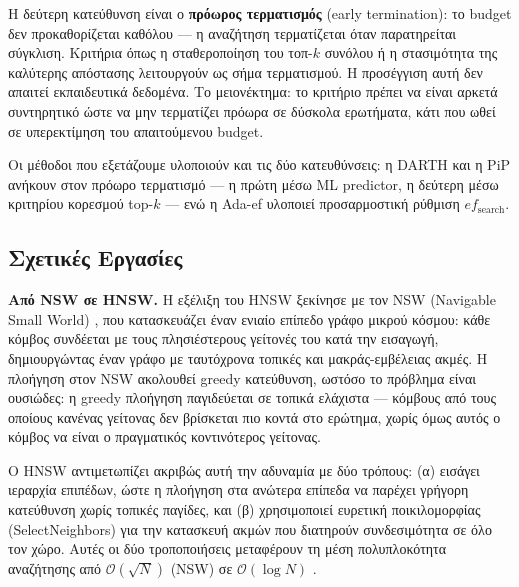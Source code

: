 \documentclass[12pt,a4paper]{article}
\begin{document}
Η δεύτερη κατεύθυνση είναι ο \textbf{πρόωρος τερματισμός} (early termination): το budget δεν προκαθορίζεται καθόλου --- η αναζήτηση τερματίζεται όταν παρατηρείται σύγκλιση. Κριτήρια όπως η σταθεροποίηση του τοπ-$k$ συνόλου ή η στασιμότητα της καλύτερης απόστασης λειτουργούν ως σήμα τερματισμού. Η προσέγγιση αυτή δεν απαιτεί εκπαιδευτικά δεδομένα. Το μειονέκτημα: το κριτήριο πρέπει να είναι αρκετά συντηρητικό ώστε να μην τερματίζει πρόωρα σε δύσκολα ερωτήματα, κάτι που ωθεί σε υπερεκτίμηση του απαιτούμενου budget.

Οι μέθοδοι που εξετάζουμε υλοποιούν και τις δύο κατευθύνσεις: η DARTH και η PiP ανήκουν στον πρόωρο τερματισμό --- η πρώτη μέσω ML predictor, η δεύτερη μέσω κριτηρίου κορεσμού top-$k$ --- ενώ η Ada-ef υλοποιεί προσαρμοστική ρύθμιση $ef_{\text{search}}$.

\subsection{Σχετικές Εργασίες}

\textbf{Από NSW σε HNSW.} Η εξέλιξη του HNSW ξεκίνησε με τον NSW (Navigable Small World) \cite{malkov2014nsw}, που κατασκευάζει έναν ενιαίο επίπεδο γράφο μικρού κόσμου: κάθε κόμβος συνδέεται με τους πλησιέστερους γείτονές του κατά την εισαγωγή, δημιουργώντας έναν γράφο με ταυτόχρονα τοπικές και μακράς-εμβέλειας ακμές. Η πλοήγηση στον NSW ακολουθεί greedy κατεύθυνση, ωστόσο το πρόβλημα είναι ουσιώδες: η greedy πλοήγηση παγιδεύεται σε τοπικά ελάχιστα --- κόμβους από τους οποίους κανένας γείτονας δεν βρίσκεται πιο κοντά στο ερώτημα, χωρίς όμως αυτός ο κόμβος να είναι ο πραγματικός κοντινότερος γείτονας.

Ο HNSW \cite{malkov2018hnsw} αντιμετωπίζει ακριβώς αυτή την αδυναμία με δύο τρόπους: (α) εισάγει ιεραρχία επιπέδων, ώστε η πλοήγηση στα ανώτερα επίπεδα να παρέχει γρήγορη κατεύθυνση χωρίς τοπικές παγίδες, και (β) χρησιμοποιεί ευρετική ποικιλομορφίας (SelectNeighbors) για την κατασκευή ακμών που διατηρούν συνδεσιμότητα σε όλο τον χώρο. Αυτές οι δύο τροποποιήσεις μεταφέρουν τη μέση πολυπλοκότητα αναζήτησης από $\mathcal{O}(\sqrt{N})$ (NSW) σε $\mathcal{O}(\log N)$ \cite{malkov2018hnsw}.
\end{document}
